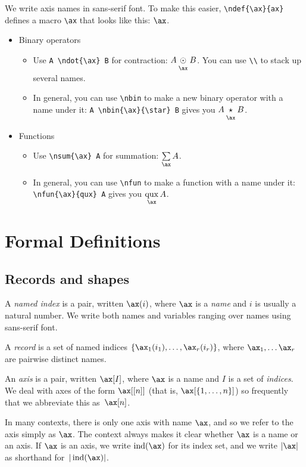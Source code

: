 \documentclass{article}
\DeclareMathOperator{\ind}{ind}
\begin{document}
We write axis names in sans-serif font. To make this easier, \verb|\ndef{\ax}{ax}| defines a macro \verb|\ax| that looks like this: $\ax$.

\begin{itemize}
\item Binary operators
  \begin{itemize}
  \item Use \verb|A \ndot{\ax} B| for contraction: $A \ndot{\ax} B$. You can use \verb|\\| to stack up several names.
  \item In general, you can use \verb|\nbin| to make a new binary operator with a name under it: \verb|A \nbin{\ax}{\star} B| gives you $A \nbin{\ax}{\star} B$.
  \end{itemize}
\item Functions
  \begin{itemize}
  \item Use \verb|\nsum{\ax} A| for summation: $\nsum{\ax} A$.
  \item In general, you can use \verb|\nfun| to make a function with a name under it: \verb|\nfun{\ax}{qux} A| gives you $\nfun{\ax}{qux} A$.
  \end{itemize}
\end{itemize}

\section{Formal Definitions}
\label{sec:definitions}

\subsection{Records and shapes}

A \emph{named index} is a pair, written $\ax(i)$, where $\ax$ is a \emph{name} and $i$ is usually a natural number. We write both names and variables ranging over names using sans-serif font.

A \emph{record} is a set of named indices $\{\ax_1(i_1), \ldots, \ax_r(i_r)\}$, where $\ax_1, \ldots \ax_r$ are pairwise distinct names. 

An \emph{axis} is a pair, written $\ax[I]$, where $\ax$ is a name and $I$ is a set of \emph{indices}.
We deal with axes of the form $\ax[[n]]$ (that is, $\ax[\{1, \ldots, n\}]$) so frequently that we abbreviate this as~$\ax[n]$.

In many contexts, there is only one axis with name $\ax$, and so we refer to the axis simply as $\ax$. The context always makes it clear whether $\ax$ is a name or an axis. If $\ax$ is an axis, we write $\ind(\ax)$ for its index set, and we write $|\ax|$ as shorthand for~$|\ind(\ax)|$.
\end{document}
